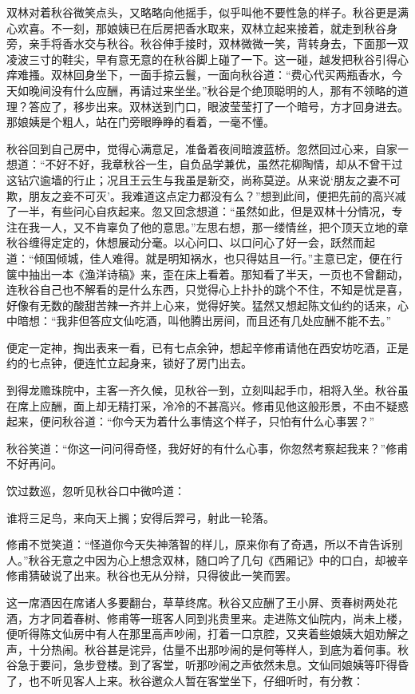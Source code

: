 \documentclass[12pt,UTF8]{ctexbook}
\begin{document}
{{{双林对着秋谷微笑点头，又略略向他摇手，似乎叫他不要性急的样子。秋谷更是满心欢喜。不一刻，那娘姨已在后房把香水取来，双林立起来接着，就走到秋谷身旁，亲手将香水交与秋谷。秋谷伸手接时，双林微微一笑，背转身去，下面那一双凌波三寸的鞋尖，早有意无意的在秋谷脚上碰了一下。这一碰，越发把秋谷引得心痒难搔。双林回身坐下，一面手掠云鬟，一面向秋谷道：“费心代买两瓶香水，今天如晚间没有什么应酬，再请过来坐坐。”秋谷是个绝顶聪明的人，那有不领略的道理？答应了，移步出来。双林送到门口，眼波莹莹打了一个暗号，方才回身进去。那娘姨是个粗人，站在门旁眼睁睁的看着，一毫不懂。

秋谷回到自己房中，觉得心满意足，准备着夜间暗渡蓝桥。忽然回过心来，自家一想道：“不好不好，我章秋谷一生，自负品学兼优，虽然花柳陶情，却从不曾干过这钻穴逾墙的行止；况且王云生与我虽是新交，尚称莫逆。从来说‘朋友之妻不可欺，朋友之妾不可灭’。我难道这点定力都没有么？”想到此间，便把先前的高兴减了一半，有些问心自疚起来。忽又回念想道：“虽然如此，但是双林十分情况，专注在我一人，又不肯辜负了他的意思。”左思右想，那一缕情丝，把个顶天立地的章秋谷缠得定定的，休想展动分毫。以心问口、以口问心了好一会，跃然而起道：“倾国倾城，佳人难得。就是明知祸水，也只得姑且一行。”主意已定，便在行箧中抽出一本《渔洋诗稿》来，歪在床上看着。那知看了半天，一页也不曾翻动，连秋谷自己也不解看的是什么东西，只觉得心上扑扑的跳个不住，不知是忧是喜，好像有无数的酸甜苦辣一齐并上心来，觉得好笑。猛然又想起陈文仙约的话来，心中暗想：“我非但答应文仙吃酒，叫他腾出房间，而且还有几处应酬不能不去。”

便定一定神，掏出表来一看，已有七点余钟，想起辛修甫请他在西安坊吃酒，正是约的七点钟，便连忙立起身来，锁好了房门出去。

到得龙赡珠院中，主客一齐久候，见秋谷一到，立刻叫起手巾，相将入坐。秋谷虽在席上应酬，面上却无精打采，冷冷的不甚高兴。修甫见他这般形景，不由不疑惑起来，便问秋谷道：“你今天为着什么事情这个样子，只怕有什么心事罢？”

秋谷笑道：“你这一问问得奇怪，我好好的有什么心事，你忽然考察起我来？”修甫不好再问。

饮过数巡，忽听见秋谷口中微吟道：

谁将三足鸟，来向天上搁；安得后羿弓，射此一轮落。

修甫不觉笑道：“怪道你今天失神落智的样儿，原来你有了奇遇，所以不肯告诉别人。”秋谷无意之中因为心上想念双林，随口吟了几句《西厢记》中的口白，却被辛修甫猜破说了出来。秋谷也无从分辩，只得彼此一笑而罢。

这一席酒因在席诸人多要翻台，草草终席。秋谷又应酬了王小屏、贡春树两处花酒，方才同着春树、修甫等一班客人同到兆贵里来。走进陈文仙院内，尚未上楼，便听得陈文仙房中有人在那里高声吵闹，打着一口京腔，又夹着些娘姨大姐劝解之声，十分热闹。秋谷甚是诧异，估量不出那吵闹的是何等样人，到底为着何事。秋谷急于要问，急步登楼。到了客堂，听那吵闹之声依然未息。文仙同娘姨等吓得昏了，也不听见客人上来。秋谷邀众人暂在客堂坐下，仔细听时，有分教：

}}}
\end{document}
